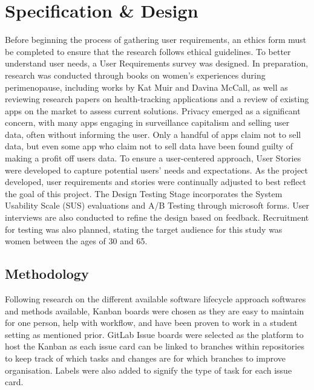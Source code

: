 
\section{Specification \& Design}\label{process}

Before beginning the process of gathering user requirements, an ethics form must be completed to ensure that the research follows ethical guidelines. To better understand user needs, a User Requirements survey was designed. In preparation, research was conducted through books on women’s experiences during perimenopause, including works by Kat Muir and Davina McCall, as well as reviewing research papers on health-tracking applications and a review of existing apps on the market to assess current solutions. Privacy emerged as a significant concern, with many apps engaging in surveillance capitalism and selling user data, often without informing the user. Only a handful of apps claim not to sell data, but even some app who claim not to sell data have been found guilty of making a profit off users data. To ensure a user-centered approach, User Stories were developed to capture potential users’ needs and expectations. As the project developed, user requirements and stories were continually adjusted to best reflect the goal of this project. The Design Testing Stage incorporates the System Usability Scale (SUS) evaluations and A/B Testing through microsoft forms. User interviews are also conducted to refine the design based on feedback. Recruitment for testing was also planned, stating the target audience for this study was women between the ages of 30 and 65.

\subsection{Methodology}
Following research on the different available software lifecycle approach softwares and methods available, Kanban boards were chosen as they are easy to maintain for one person, help with workflow, and have been proven to work in a student setting as mentioned prior. GitLab Issue boards were selected as the platform to host the Kanban as each issue card can be linked to branches within repositories to keep track of which tasks and changes are for which branches to improve organisation. Labels were also added to signify the type of task for each issue card.
 

